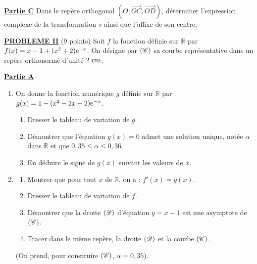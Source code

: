       \underline{\textbf{Partie C}} \newline
      Dans le rep\`ere orthogonal $(O ; \overrightarrow{OC} , \overrightarrow{OD})$, d\'eterminer l'expression complexe
      de la transformation $s$ ainsi que l'affixe de son centre.

\noindent \underline{\textsc{\textbf{PROBLEME II}}} (9 points) \newline
      Soit $f$ la fonction d\'efinie sur $\mathbb{R}$ par $f(x) = x - 1 + (x^2 + 2) \mathrm{e}^{-x}$.
      On d\'esigne par $(\mathscr{C})$ sa courbe repr\'esentative dans un rep\`ere orthonorm\'e \Oij{} d'unit\'e $2~\mathrm{cm}$.
      
      \underline{\textbf{Partie A}} 
      \begin{enumerate}
            \item On donne la fonction num\'erique $g$ d\'efinie sur $\mathbb{R}$ par $g(x) = 1 - (x^2 - 2x + 2) \mathrm{e}^{-x}$.
                  \begin{enumerate}
                        \item Dresser le tableau de variation de $g$.
                        \item D\'emontrer que l'\'equation $g(x) = 0$ admet une solution unique, 
                              not\'ee $\alpha$ dans $\mathbb{R}$ et que $0,35 \leq \alpha \leq 0,36$.
                        \item En d\'eduire le signe de $g(x)$ suivant les valeurs de $x$.
                  \end{enumerate}
            \item \begin{enumerate}
                        \item Montrer que pour tout $x$ de $\mathbb{R}$, on a : $f'(x) = g(x)$.
                        \item Dresser le tableau de variation de $f$.
                        \item D\'emontrer que la droite $(\mathscr{D})$ d'\'equation $y=x-1$ est une asymptote de $(\mathscr{C})$.
                        \item Tracer dans le m\^eme rep\`ere, la droite $(\mathscr{D})$ et la courbe $(\mathscr{C})$.
                  \end{enumerate}
                  (On prend, pour construire $(\mathscr{C})$, $\alpha = 0,35$).
      \end{enumerate}
      
